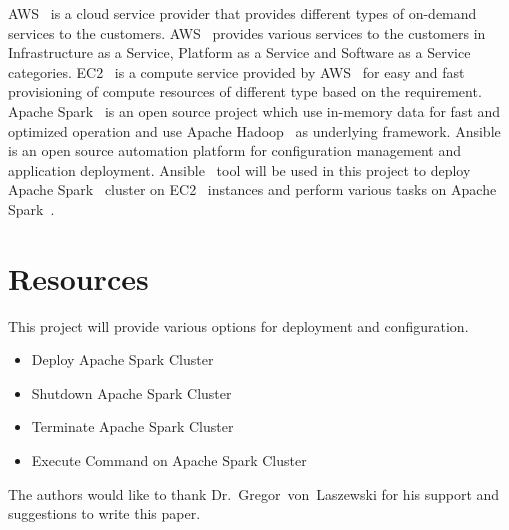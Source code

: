 AWS~\cite{hid-sp18-511-www-aws} is a cloud service provider that
provides different types of on-demand services to the
customers. AWS~\cite{hid-sp18-511-www-aws} provides various services
to the customers in Infrastructure as a Service, Platform as a Service
and Software as a Service categories. EC2~\cite{hid-sp18-511-www-ec2}
is a compute service provided by AWS~\cite{hid-sp18-511-www-aws} for
easy and fast provisioning of compute resources of different type
based on the requirement. Apache Spark~\cite{hid-sp18-511-www-spark}
is an open source project which use in-memory data for fast and
optimized operation and use Apache
Hadoop~\cite{hid-sp18-511-www-hadoop} as underlying
framework. Ansible~\cite{hid-sp18-511-www-ansible} is an open source
automation platform for configuration management and application
deployment. Ansible~\cite{hid-sp18-511-www-ansible} tool will be used
in this project to deploy Apache Spark~\cite{hid-sp18-511-www-spark}
cluster on EC2~\cite{hid-sp18-511-www-ec2} instances and perform
various tasks on Apache Spark~\cite{hid-sp18-511-www-spark}.

\section{Resources}
This project will provide various options for deployment and
configuration.

\begin{itemize}
	\item Deploy Apache Spark Cluster
        \item Shutdown Apache Spark Cluster
        \item Terminate Apache Spark Cluster
        \item Execute Command on Apache Spark Cluster
\end{itemize}

\begin{acks}

  The authors would like to thank Dr.~Gregor~von~Laszewski for his
  support and suggestions to write this paper.

\end{acks}


 

